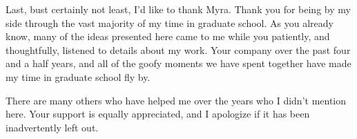 Last, bust certainly not least, I'd like to thank Myra.  Thank you for being by my side through the vast majority of my time in graduate school.  As you already know, many of the ideas presented here came to me while you patiently, and thoughtfully, listened to details about my work.  Your company over the past four and a half years, and all of the goofy moments we have spent together have made my time in graduate school fly by.
 
There are many others who have helped me over the years who I didn't mention here.  Your support is equally appreciated, and I apologize if it has been inadvertently left out.

    
    
